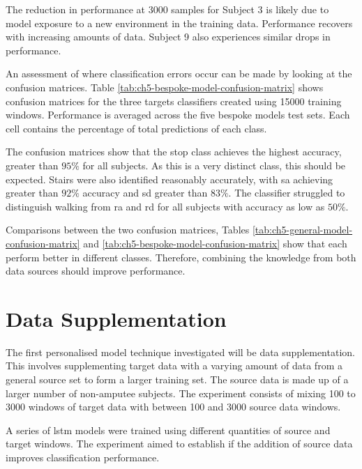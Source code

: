 The reduction in performance at 3000 samples for Subject 3 is likely due to model exposure to a new environment in the training data. Performance recovers with increasing amounts of data. Subject 9 also experiences similar drops in performance.

An assessment of where classification errors occur can be made by looking at the confusion matrices. Table \ref{tab:ch5-bespoke-model-confusion-matrix} shows confusion matrices for the three targets classifiers created using 15000 training windows. Performance is averaged across the five bespoke models test sets. Each cell contains the percentage of total predictions of each class.

The confusion matrices show that the stop class achieves the highest accuracy, greater than $95\%$ for all subjects. As this is a very distinct class, this should be expected. Stairs were also identified reasonably accurately, with \acrlong{sa} achieving greater than $92\%$ accuracy and \acrlong{sd} greater than $83\%$. The classifier struggled to distinguish walking from \acrlong{ra} and \acrlong{rd} for all subjects with accuracy as low as $50\%$.

Comparisons between the two confusion matrices, Tables \ref{tab:ch5-general-model-confusion-matrix} and \ref{tab:ch5-bespoke-model-confusion-matrix} show that each perform better in different classes. Therefore, combining the knowledge from both data sources should improve performance.

\section{Data Supplementation}
\label{sec:model-personalisation-results-supplementation}
The first personalised model technique investigated will be data supplementation. This involves supplementing target data with a varying amount of data from a general source set to form a larger training set. The source data is made up of a larger number of non-amputee subjects. The experiment consists of mixing 100 to 3000 windows of target data with between 100 and 3000 source data windows.

A series of \acrshort{lstm} models were trained using different quantities of source and target windows. The experiment aimed to establish if the addition of source data improves classification performance.

